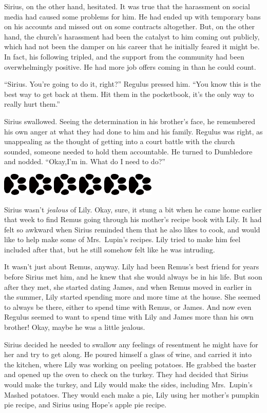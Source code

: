 \documentclass[12pt,twoside,openright]{memoir}
\newcommand{\dogPrintRule}{	
	\begin{center}
		\hspace{.5em}
		\includegraphics[angle=60]{dogprint.pdf}
		\hspace{.5em}
		\includegraphics[angle=120]{dogprint.pdf}
		\hspace{.5em}
		\includegraphics[angle=60]{dogprint.pdf}
		\hspace{.5em}
		\includegraphics[angle=120]{dogprint.pdf}
		\hspace{.5em}
		\includegraphics[angle=60]{dogprint.pdf}
		\hspace{.5em}
		\includegraphics[angle=120]{dogprint.pdf}
		\hspace{.5em}
	\end{center}
}
\begin{document}
Sirius, on the other hand, hesitated. It was true that the harassment on social media had caused some problems for him. He had ended up with temporary bans on his accounts and missed out on some contracts altogether. But, on the other hand, the church's harassment had been the catalyst to him coming out publicly, which had not been the damper on his career that he initially feared it might be. In fact, his following tripled, and the support from the community had been overwhelmingly positive. He had more job offers coming in than he could count. 

``Sirius. You're going to do it, right?'' Regulus pressed him. ``You know this is the best way to get back at them. Hit them in the pocketbook, it's the only way to really hurt them.'' 

Sirius swallowed. Seeing the determination in his brother's face, he remembered his own anger at what they had done to him and his family. Regulus was right, as unappealing as the thought of getting into a court battle with the church sounded, someone needed to hold them accountable. He turned to Dumbledore and nodded. ``Okay,I'm in. What do I need to do?''

\dogPrintRule

Sirius wasn't \textit{jealous} of Lily. Okay, sure, it stung a bit when he came home earlier that week to find Remus going through his mother's recipe book with Lily. It had felt so awkward when Sirius reminded them that he also likes to cook, and would like to help make some of Mrs.\ Lupin's recipes. Lily tried to make him feel included after that, but he still somehow felt like he was intruding. 

It wasn't just about Remus, anyway. Lily had been Remus's best friend for years before Sirius met him, and he knew that she would always be in his life. But soon after they met, she started dating James, and when Remus moved in earlier in the summer, Lily started spending more and more time at the house. She seemed to always be there, either to spend time with Remus, or James. And now even Regulus seemed to want to spend time with Lily and James more than his own brother! Okay, maybe he was a little jealous.

Sirius decided he needed to swallow any feelings of resentment he might have for her and try to get along. He poured himself a glass of wine, and carried it into the kitchen, where Lily was working on peeling potatoes. He grabbed the baster and opened up the oven to check on the turkey. They had decided that Sirius would make the turkey, and Lily would make the sides, including Mrs.\ Lupin's Mashed potatoes. They would each make a pie, Lily using her mother's pumpkin pie recipe, and Sirius using Hope's apple pie recipe. 
\end{document}
